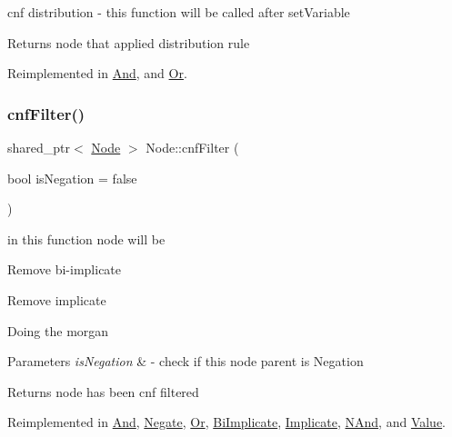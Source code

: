 cnf distribution -\/ this function will be called after set\+Variable 

\begin{DoxyReturn}{Returns}
node that applied distribution rule 
\end{DoxyReturn}


Reimplemented in \hyperlink{class_and_a370c86f44ee17b22208cdbc1f17a7b3f}{And}, and \hyperlink{class_or_ae49bee04503f31d32750ecf8671e5552}{Or}.

\mbox{\label{class_node_ab5b01fd3c4efe0f2eaf7fc41653359b7}} 
\subsubsection{\texorpdfstring{cnf\+Filter()}{cnfFilter()}}
{\footnotesize\ttfamily shared\+\_\+ptr$<$ \hyperlink{class_node}{Node} $>$ Node\+::cnf\+Filter (\begin{DoxyParamCaption}\item[{bool}]{is\+Negation = {\ttfamily false} }\end{DoxyParamCaption})\hspace{0.3cm}{\ttfamily [virtual]}}



in this function node will be 


\begin{DoxyItemize}
\item Remove bi-\/implicate
\item Remove implicate
\item Doing the morgan 
\begin{DoxyParams}{Parameters}
{\em is\+Negation} & -\/ check if this node parent is Negation \\
\hline
\end{DoxyParams}
\begin{DoxyReturn}{Returns}
node has been cnf filtered 
\end{DoxyReturn}

\end{DoxyItemize}

Reimplemented in \hyperlink{class_and_a18ea23cd682dce93808c34ea0243897f}{And}, \hyperlink{class_negate_a6aa803fea460f0a2a52399b778bfd268}{Negate}, \hyperlink{class_or_ad8a208aee185d567ede5c92f39796faa}{Or}, \hyperlink{class_bi_implicate_a3f79e7340ff831b0bb927d8a70414ac3}{Bi\+Implicate}, \hyperlink{class_implicate_a84e18887eae8891eec583aafaf2bf63d}{Implicate}, \hyperlink{class_n_and_a2df64f0858e90841201a2acaf50ac587}{N\+And}, and \hyperlink{class_value_a56c458de6a68b9a25233e6fdcfa67760}{Value}.

